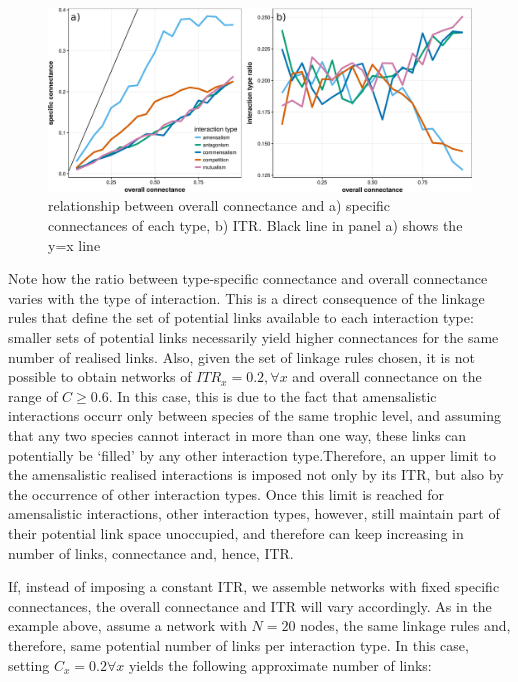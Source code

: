 \begin{figure}[!ht]
\centering
\includegraphics[width=\textwidth]{./Figures/Appendix3_4/Fig_1.png}
\caption[Connectance and interaction frequencies]{\color{Gray} relationship between overall connectance and a) specific connectances of each type, b) ITR. Black line in panel a) shows the y=x line}
\label{fig:figApp3.4.1}
\end{figure}

Note how the ratio between type-specific connectance and overall connectance varies with the type of interaction. This is a direct consequence of the linkage rules that define the set of potential links available to each interaction type: smaller sets of potential links necessarily yield higher connectances for the same number of realised links. Also, given the set of linkage rules chosen, it is not possible to obtain networks of \(ITR_x = 0.2 , \forall x\) and overall connectance on the range of \(C \geq 0.6\). In this case, this is due to the fact that amensalistic interactions occurr only between species of the same trophic level, and assuming that any two species cannot interact in more than one way, these links can potentially be `filled' by any other interaction type.Therefore, an upper limit to the amensalistic realised interactions is imposed not only by its ITR, but also by the occurrence of other interaction types. Once this limit is reached for amensalistic interactions, other interaction types, however, still maintain part of their potential link space unoccupied, and therefore can keep increasing in number of links, connectance and, hence, ITR.

If, instead of imposing a constant ITR, we assemble networks with fixed specific connectances, the overall connectance and ITR will vary accordingly. As in the example above, assume a network with \(N = 20\) nodes, the same linkage rules and, therefore, same potential number of links per interaction type. In this case, setting \(C_x = 0.2 \forall x\) yields the following approximate number of links:

